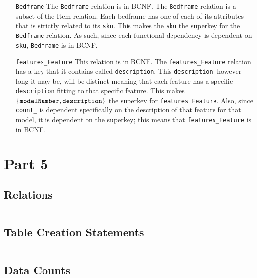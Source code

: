 \documentclass[american,extrafontsizes,12pt,portrait,letterpaper,oneside,onecolumn,final]{memoir}
\newcommand*\rnmath[1]{\(\displaystyle #1 \textstyle\)}
\newcommand*{\sqli}[1]{\texttt{#1}}
\newcommand*{\sqlm}[1]{\text{\sqli{#1}}}
\begin{document}
\begin{enumerate}[leftmargin=*,widest={\texttt{DistributionCenter}}]
\item[\sqli{Bedframe}]
The \sqli{Bedframe} relation is in BCNF.
The \sqli{Bedframe} relation is a subset of the Item relation.
Each bedframe has one of each of its attributes that is strictly related to its \sqli{sku}.
This makes the \sqli{sku} the superkey for the \sqli{Bedframe} relation.
As such, since each functional dependency is dependent on \sqli{sku}, \sqli{Bedframe} is in BCNF.

\item[\sqli{features_Feature}]
This relation is in BCNF.
The \sqli{features_Feature} relation has a key that it contains called \sqli{description}.
This \sqli{description}, however long it may be, will be distinct meaning that each feature has a specific \sqli{description} fitting to that specific feature.
This makes \rnmath{\{\sqlm{modelNumber}, \sqlm{description}\}} the superkey for \sqli{features_Feature}.
Also, since \sqli{count_} is dependent specifically on the description of that feature for that model, it is dependent on the superkey; this means that \sqli{features_Feature} is in BCNF.

\end{enumerate}

\chapter{Part 5}

\section{Relations}

\inputminted[linenos,breaklines,breakbytokenanywhere]{sql}{../Part\ 5/normalized.sql}

\section{Table Creation Statements}

\inputminted[linenos,breaklines,breakbytokenanywhere]{mysql}{../Part\ 5/mysql.sql}

\section{Data Counts}
\end{document}
